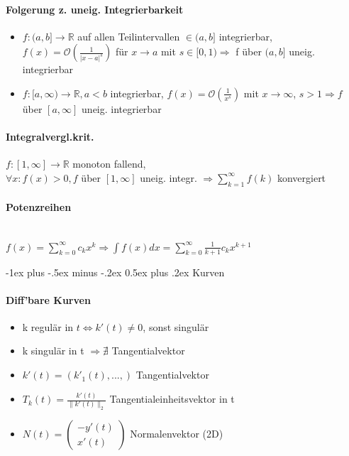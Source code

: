 \documentclass[paper=a3,paper=landscape, fontsize=9pt, DIV=30]{scrartcl}
\makeatletter
\newcommand{\real}{{\mathbb{R}}}
\newcommand{\laO}{\mathcal{O}}
\renewcommand{\section}{\@startsection{section}{1}{0mm}%
  {-1ex plus -.5ex minus -.2ex}%
  {0.5ex plus .2ex}%
  {\color{blue}\normalfont\large\bfseries}}
\makeatother
\begin{document}
\begin{multicols*}{4}
	\paragraph{Folgerung z. uneig. Integrierbarkeit}
	\begin{itemize}
		\item $f: (a,b] \rightarrow \real$ auf allen Teilintervallen $\in (a,b]$ integrierbar, $f(x)=\laO(\frac{1}{\lvert x-a \rvert ^s})$ für $x \rightarrow a$ mit $s \in [0,1) \Rightarrow$ f über $(a,b]$ uneig. integrierbar
		\item $f: [a,\infty) \rightarrow \real, a<b$ integrierbar, $f(x)=\laO(\frac{1}{x^s})$ mit $x \rightarrow \infty$, $s > 1 \Rightarrow f$ über $[a,\infty]$ uneig. integrierbar
	\end{itemize}


  \paragraph{Integralvergl.krit.}
  $f:[1,\infty]\rightarrow\real$ monoton fallend,\\$\forall x: f(x)>0, f$ über $[1,\infty]$ uneig. integr. $\Rightarrow \sum_{k=1}^{\infty}f(k)$ konvergiert


  \paragraph{Potenzreihen}\hspace{0pt} \\
  $f(x)=\sum_{k=0}^{\infty}c_kx^k \Rightarrow \int f(x)dx=\sum_{k=0}^{\infty}\frac{1}{k+1}c_kx^{k+1}$



  \section{Kurven}
  \paragraph{Diff'bare Kurven}
  \begin{itemize}
  \item k regulär in $t \Leftrightarrow k'(t) \neq 0$, sonst singulär
  \item k singulär in t $\Rightarrow \nexists$ Tangentialvektor
  \item $k'(t)=(k'_1(t),...,)$ Tangentialvektor
  \item $T_k(t)=\frac{k'(t)}{\lVert k'(t)\rVert_2}$ Tangentialeinheitsvektor in t
  \item $N(t)=\begin{pmatrix}
  -y'(t)\\x'(t)
  \end{pmatrix}$ Normalenvektor (2D)
  \end{itemize}



\end{multicols*}
\end{document}
